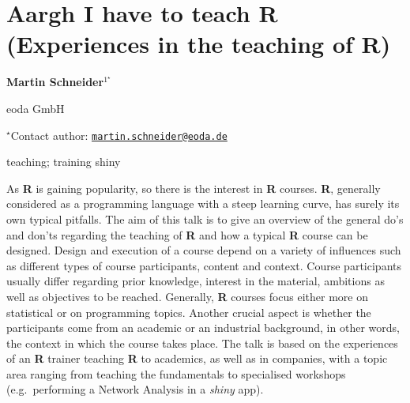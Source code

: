\documentclass[\main/boa.tex]{subfiles}
\begin{document}
\section{Aargh I have to teach R (Experiences in the teaching of R)}

\begin{center}
  {\bf Martin Schneider$^{1^\star}$}
\end{center}

\vskip 0.3cm

\begin{affiliations}
\begin{enumerate}
\begin{minipage}{0.915\textwidth}
\centering
\item eoda GmbH \\[-2pt]
\end{minipage}
\end{enumerate}
$^\star$Contact author: \href{mailto:martin.schneider@eoda.de}{\nolinkurl{martin.schneider@eoda.de}}\\
\end{affiliations}

\vskip 0.5cm

\begin{minipage}{0.915\textwidth}
\keywords teaching; training
\packages shiny
\end{minipage}

\vskip 0.8cm

As \textbf{R} is gaining popularity, so there is the interest in
\textbf{R} courses. \textbf{R}, generally considered as a programming
language with a steep learning curve, has surely its own typical
pitfalls. The aim of this talk is to give an overview of the general
do's and don'ts regarding the teaching of \textbf{R} and how a typical
\textbf{R} course can be designed. Design and execution of a course
depend on a variety of influences such as different types of course
participants, content and context. Course participants usually differ
regarding prior knowledge, interest in the material, ambitions as well
as objectives to be reached. Generally, \textbf{R} courses focus either
more on statistical or on programming topics. Another crucial aspect is
whether the participants come from an academic or an industrial
background, in other words, the context in which the course takes place.
The talk is based on the experiences of an \textbf{R} trainer teaching
\textbf{R} to academics, as well as in companies, with a topic area
ranging from teaching the fundamentals to specialised workshops
(e.g.~performing a Network Analysis in a \emph{shiny} app).
\end{document}
